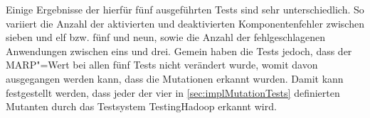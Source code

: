 Einige Ergebnisse der hierfür fünf ausgeführten Tests sind sehr unterschiedlich.
So variiert die Anzahl der aktivierten und deaktivierten Komponentenfehler zwischen sieben und elf bzw. fünf und neun, sowie die Anzahl der fehlgeschlagenen Anwendungen zwischen eins und drei.
Gemein haben die Tests jedoch, dass der \gls{MARP}"=Wert bei allen fünf Tests nicht verändert wurde, womit davon ausgegangen werden kann, dass die Mutationen erkannt wurden.
Damit kann festgestellt werden, dass jeder der vier in \cref{sec:implMutationTests} definierten Mutanten durch das Testsystem TestingHadoop erkannt wird.
